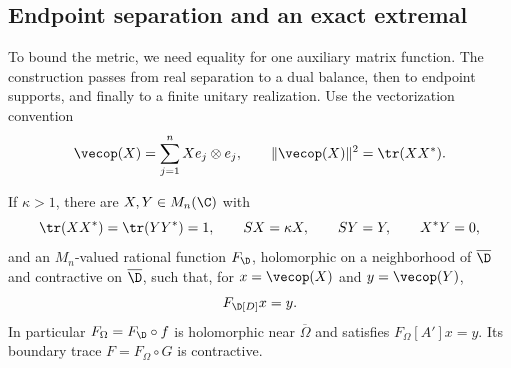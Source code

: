 \subsection{Endpoint separation and an exact extremal}
To bound the metric, we need equality for one auxiliary matrix function.
The construction passes from real separation to a dual balance, then to
endpoint supports, and finally to a finite unitary realization.
Use the vectorization convention
\[
 \vecop(X)=\sum_{j=1}^nXe_j\otimes e_j,\qquad
 \|\vecop(X)\|^2=\tr(XX^*).
\]

\begin{proposition}\label{prop:extremal}
If $\kappa>1$, there are $X,Y\in M_n(\C)$ with
\[
 \tr(XX^*)=\tr(YY^*)=1,\qquad SX=\kappa X,\qquad SY=Y,
 \qquad X^*Y=0,
\]
and an $M_n$-valued rational function $F_\D$, holomorphic on a neighborhood
of $\overline\D$ and contractive on $\overline\D$, such that, for
$x=\vecop(X)$ and $y=\vecop(Y)$,
\[
 F_\D[D]x=y.
\]
In particular $F_\Omega=F_\D\circ f$ is holomorphic near
$\overline\Omega$ and satisfies $F_\Omega[A']x=y$. Its boundary trace
$F=F_\Omega\circ G$ is contractive.
\end{proposition}
